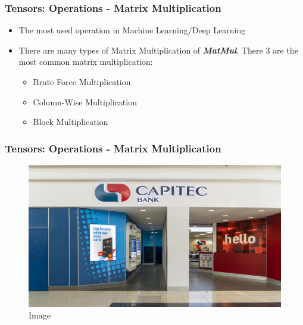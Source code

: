\documentclass[11pt]{beamer}
\begin{document}
\begin{frame}
	\frametitle{Tensors: Operations - Matrix Multiplication}
\begin{itemize}
	\item The most used operation in Machine Learning/Deep Learning
	\item There are many types of Matrix Multiplication of \textit{\textbf{MatMul}}. There 3 are the most common matrix multiplication:
	\begin{itemize}
		\item Brute Force Multiplication
		\item Column-Wise Multiplication
		\item Block Multiplication		
	\end{itemize}
\end{itemize}
\end{frame}

\begin{frame}
	\frametitle{Tensors: Operations - Matrix Multiplication}
	\begin{figure}
		\includegraphics[scale=0.17]{"1 - original_image"}
		\caption{Image}
	\end{figure}
\end{frame}
\end{document}
